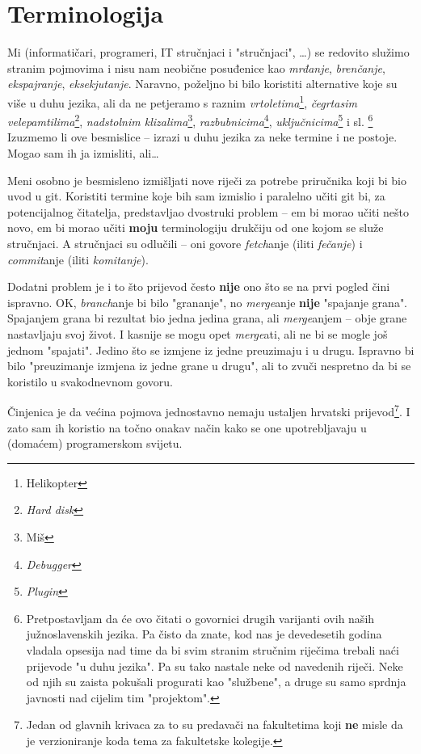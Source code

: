 \chapter*{Terminologija}

Mi (informatičari, programeri, IT stručnjaci i "stručnjaci", \dots) se redovito služimo stranim pojmovima i nisu nam neobične posuđenice kao \emph{mrđanje}, \emph{brenčanje}, \emph{ekspajranje}, \emph{eksekjutanje}.
Naravno, poželjno bi bilo koristiti alternative koje su više u duhu jezika, ali da ne petjeramo s raznim \emph{vrtoletima}\footnote{Helikopter}, \emph{čegrtasim velepamtilima}\footnote{\emph{Hard disk}}, \emph{nadstolnim klizalima}\footnote{Miš}, \emph{razbubnicima}\footnote{\emph{Debugger}}, \emph{uključnicima}\footnote{\emph{Plugin}} i sl.%
\footnote{Pretpostavljam da će ovo čitati o govornici drugih varijanti ovih naših južnoslavenskih jezika. Pa čisto da znate, kod nas je devedesetih godina vladala opsesija nad time da bi svim stranim stručnim riječima trebali naći prijevode "u duhu jezika". Pa su tako nastale neke od navedenih riječi. Neke od njih su zaista pokušali progurati kao "službene", a druge su samo sprdnja javnosti nad cijelim tim "projektom".}
Izuzmemo li ove besmislice -- izrazi u duhu jezika za neke termine i ne postoje.
Mogao sam ih ja izmisliti, ali\dots

Meni osobno je besmisleno izmišljati nove riječi za potrebe priručnika koji bi bio uvod u git.
Koristiti termine koje bih sam izmislio i paralelno učiti git bi, za potencijalnog čitatelja, predstavljao dvostruki problem -- em bi morao učiti nešto novo, em bi morao učiti \textbf{moju} terminologiju drukčiju od one kojom se služe stručnjaci.
A stručnjaci su odlučili -- oni govore \emph{fetch}anje (iliti \emph{fečanje}) i \emph{commit}anje (iliti \emph{komitanje}).

Dodatni problem je i to što prijevod često \textbf{nije} ono što se na prvi pogled čini ispravno.
OK, \emph{branch}anje bi bilo "grananje", no \emph{merge}anje \textbf{nije} "spajanje grana". 
Spajanjem grana bi rezultat bio jedna jedina grana, ali \emph{merge}anjem -- obje grane nastavljaju svoj život. 
I kasnije se mogu opet \emph{merge}ati, ali ne bi se mogle još jednom "spajati".
Jedino što se izmjene iz jedne preuzimaju i u drugu. 
Ispravno bi bilo "preuzimanje izmjena iz jedne grane u drugu", ali to zvuči nespretno da bi se koristilo u svakodnevnom govoru.

Činjenica je da većina pojmova jednostavno nemaju ustaljen hrvatski prijevod\footnote{Jedan od glavnih krivaca za to su predavači na fakultetima koji \textbf{ne} misle da je verzioniranje koda tema za fakultetske kolegije.}. 
I zato sam ih koristio na točno onakav način kako se one upotrebljavaju u (domaćem) programerskom svijetu.

